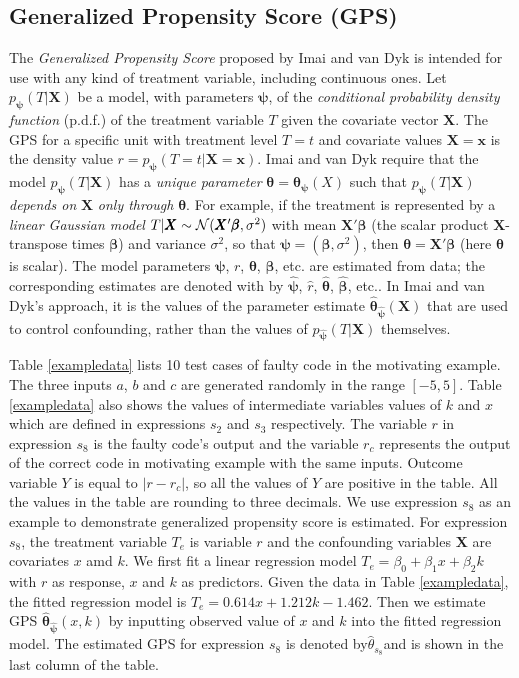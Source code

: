 \subsection{Generalized Propensity Score (GPS)}\label{IIIC}
The {\it Generalized Propensity Score} proposed by Imai and van Dyk \cite{Imai2004} is intended for use with any kind of treatment variable, including continuous ones.  Let ${p_{\pmb{\psi}} }(T|\pmb{X})$  be a model, with parameters $\pmb{\psi}$, of the {\it conditional probability density function} (p.d.f.) of the treatment variable $T$ given the covariate vector $\pmb{X}$.  The GPS for a specific unit with treatment level $T=t$ and covariate values $\pmb{X=x}$ is the density value $r = {p_{\pmb\psi} }(T = t|{\pmb X} = {\pmb x})$.  Imai and van Dyk \cite{Imai2004} require that the model ${p_{\pmb{\psi}} }(T|\pmb{X})$ has a {\it unique parameter} ${\pmb\theta}  = \pmb{\theta _\psi }(X)$ such that ${p_{\pmb{\psi}} }(T|\pmb{X})$ {\it depends on} $\pmb X$ {\it only through} $\pmb \theta$.  For example, if the treatment is represented by a {\it linear Gaussian model} $T|\pmb{X} \sim {\cal N}(\pmb{X}'{\pmb \beta} ,{\sigma ^2})$ with mean $\pmb{X}'{\pmb \beta}$  (the scalar product $\pmb{X}$-transpose times $\pmb{\beta}$) and variance $\sigma ^2$, so that $\pmb{\psi}  = \left( {\pmb{\beta} ,{\sigma ^2}} \right)$, then $\pmb{\theta}  = \pmb{X}'\pmb{\beta} $ (here $\pmb{\theta} $ is scalar).  The model parameters $\pmb{\psi}$, $r$, $\pmb{\theta}$, $\pmb{\beta}$, etc. are estimated from data; the corresponding estimates are denoted with by $\hat {\pmb\psi} $, $\hat r$, $\hat{ \pmb{\theta}} $, $\hat{ \pmb{\beta}}$, etc..  In Imai and van Dyk's approach, it is the values of the parameter estimate ${{\hat{\pmb{\theta}} }_{\hat{ \pmb{\psi}} }}(\pmb{X})$ that are used to control confounding, rather than the values of ${p_{\hat{ \pmb{\psi}} }}(T|\pmb{X})$ themselves.

Table \ref{exampledata} lists 10 test cases of faulty code in the motivating example. The three inputs $a$, $b$ and $c$ are generated randomly in the range $[-5, 5]$.  Table \ref{exampledata} also shows the values of intermediate variables values of $k$ and $x$ which are defined in expressions $s_2$ and $s_3$ respectively. The variable $r$ in expression $s_8$ is the faulty code's output and the variable $r_c$ represents the output of the correct code in motivating example with the same inputs. Outcome variable $Y$ is equal to $|r-r_c|$, so all the values of $Y$ are positive in the table. All the values in the table are rounding to three decimals. We use expression $s_8$ as an example to demonstrate generalized propensity score is estimated. For expression $s_8$, the treatment variable $T_e$ is variable $r$ and the confounding variables $\pmb{X}$ are covariates $x$ amd $k$. We first fit a linear regression model $T_e = \beta_0+{\beta_1}x+{\beta_2}k$ with $r $ as response, $x$ and $k$ as predictors. Given the data in Table \ref{exampledata}, the fitted regression model is $ T_e =0.614x+1.212k-1.462$. Then we estimate GPS ${{\hat{\pmb{\theta}} }_{\hat{ \pmb{\psi}} }}(x, k)$  by inputting observed value of $x$ and $k$ into the fitted regression model.  The estimated GPS for expression $s_8$ is denoted by$ {\hat{\theta}}_{s_8} $and is shown in the last column of the table.  

